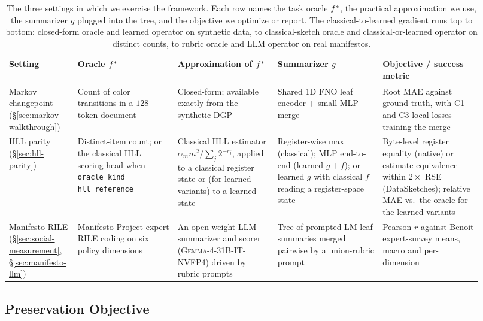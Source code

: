 \begin{table}[htbp]
\centering\small
\setlength{\tabcolsep}{4pt}
\begin{tabular}{p{0.11\linewidth}p{0.20\linewidth}p{0.20\linewidth}p{0.21\linewidth}p{0.20\linewidth}}
\toprule
Setting & Oracle $f^\ast$ & Approximation of $f^\ast$ & Summarizer $g$ & Objective / success metric \\
\midrule
Markov changepoint (\S\ref{sec:markov-walkthrough}) &
Count of color transitions in a $128$-token document &
Closed-form; available exactly from the synthetic DGP &
Shared 1D FNO leaf encoder $+$ small MLP merge &
Root MAE against ground truth, with C1 and C3 local losses training the merge \\[2pt]
HLL parity (\S\ref{sec:hll-parity}) &
Distinct-item count; or the classical HLL scoring head when \texttt{oracle\_kind} $=$ \texttt{hll\_reference} &
Classical HLL estimator $\alpha_m m^2 / \sum_j 2^{-r_j}$, applied to a classical register state or (for learned variants) to a learned state &
Register-wise max (classical); MLP end-to-end (learned $g{+}f$); or learned $g$ with classical $f$ reading a register-space state &
Byte-level register equality (native) or estimate-equivalence within $2\times$ RSE (DataSketches); relative MAE vs.\ the oracle for the learned variants \\[2pt]
Manifesto RILE (\S\ref{sec:social-measurement}, \S\ref{sec:manifesto-llm}) &
Manifesto-Project expert RILE coding on six policy dimensions &
An open-weight LLM summarizer and scorer (\textsc{Gemma-4-31B-IT-NVFP4}) driven by rubric prompts &
Tree of prompted-LM leaf summaries merged pairwise by a union-rubric prompt &
Pearson $r$ against Benoit expert-survey means, macro and per-dimension \\
\bottomrule
\end{tabular}
\caption{The three settings in which we exercise the framework. Each row names the task oracle $f^\ast$, the practical approximation we use, the summarizer $g$ plugged into the tree, and the objective we optimize or report. The classical-to-learned gradient runs top to bottom: closed-form oracle and learned operator on synthetic data, to classical-sketch oracle and classical-or-learned operator on distinct counts, to rubric oracle and LLM operator on real manifestos.}
\label{tab:settings-comparison}
\end{table}

\subsection{Preservation Objective}

